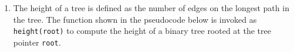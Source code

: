 \documentclass[journal]{IEEEtran}
\numberwithin{equation}{enumi}
\numberwithin{figure}{enumi}
\begin{document}
\begin{enumerate}
The missing arcs in the DFA are to be determined.
\begin{center}
\begin{tabular}{cc}
(A) 
\begin{tabular}{|c|c|c|c|c|c|}
\hline
   & 00 & 01 & 10 & 11 & q \\ \hline
00 & 1  & 0  &    &    &   \\ \hline
01 &    &    &    & 1  &   \\ \hline
10 & 0  &    &    &    &   \\ \hline
11 &    &    & 0  &    &   \\ \hline
\end{tabular}

(B) 
\begin{tabular}{|c|c|c|c|c|c|}
\hline
   & 00 & 01 & 10 & 11 & q \\ \hline
00 &    & 0  &    &    & 1 \\ \hline
01 &    & 1  &    &    &   \\ \hline
10 &    &    &    & 0  &   \\ \hline
11 &    & 0  &    &    &   \\ \hline
\end{tabular}
\\[1cm]
(C) 
\begin{tabular}{|c|c|c|c|c|c|}
\hline
   & 00 & 01 & 10 & 11 & q \\ \hline
00 &    & 1  &    &    & 0 \\ \hline
01 &    & 1  &    &    &   \\ \hline
10 &    &    & 0  &    &   \\ \hline
11 &    & 0  &    &    &   \\ \hline
\end{tabular}

(D) 
\begin{tabular}{|c|c|c|c|c|c|}
\hline
   & 00 & 01 & 10 & 11 & q \\ \hline
00 &    & 1  &    &    & 0 \\ \hline
01 &    &    &    & 1  &   \\ \hline
10 & 0  &    &    &    &   \\ \hline
11 &    &    & 0  &    &   \\ \hline
\end{tabular}
\end{tabular}
\end{center}


\item The height of a tree is defined as the number of edges on the longest path in the tree.  
The function shown in the pseudocode below is invoked as \texttt{height(root)} to compute the height of a binary tree rooted at the tree pointer \texttt{root}.


\end{enumerate}
\end{document}
